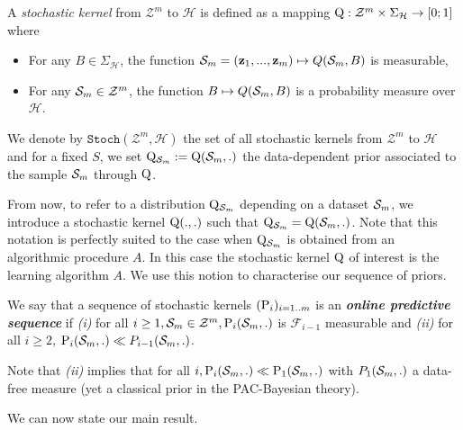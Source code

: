 \begin{definition}
    A \emph{stochastic kernel} from $\mathcal{Z}^m$ to $\mathcal{H}$ is defined as a mapping $\Q: \mathcal{Z}^m\times \Sigma_{\mathcal{H}} \rightarrow [0;1]$ where
    \begin{itemize}
        \item For any $B\in \Sigma_{\mathcal{H}}$, the function  $\Sm=(\z_1,...,\z_m)\mapsto Q(\Sm,B)$ is measurable,
        \item For any $\Sm\in\mathcal{Z}^m$, the function $B\mapsto Q(\Sm,B)$ is a probability measure over $\mathcal{H}$.
    \end{itemize}
    We denote by $\texttt{Stoch}(\mathcal{Z}^m,\mathcal{H})$ the set of all stochastic kernels from $\mathcal{Z}^m$ to $\mathcal{H}$ and for a fixed $S$, we set $\Q_{\Sm}:= \Q(\Sm,.)$ the data-dependent prior associated to the sample $\Sm$ through $\Q$.
\end{definition}

From now, to refer to a distribution $\Q_{\Sm}$ depending on a dataset $\Sm$, we introduce a stochastic kernel $\Q(.,.)$ such that $\Q_{\Sm} = \Q(\Sm,.)$. Note that this notation is perfectly suited to the case when $\Q_{\Sm}$ is obtained from an algorithmic procedure $A$. In this case the stochastic kernel $\Q$ of interest is the learning algorithm $A$.
We use this notion to characterise our sequence of priors.

\begin{definition}
  We say that a sequence of stochastic kernels $(\P_{i})_{i=1..m}$ is an \emph{\textbf{online predictive sequence}} if \textit{(i)} for all $i\geq 1, \Sm\in\mathcal{Z}^m, \P_{i}(\Sm,.)$ is $\mathcal{F}_{i-1}$ measurable and \textit{(ii)} for all $i \geq 2$, $\P_{i}(\Sm,.)\ll P_{i-1}(\Sm,.)$.
\end{definition}

Note that \textit{(ii)} implies that for all $i, \P_{i}(\Sm,.)\ll \P_1(\Sm,.)$ with $P_1(\Sm,.)$ a data-free measure (yet a classical prior in the PAC-Bayesian theory).


We can now state our main result.

